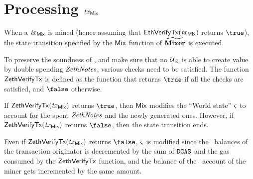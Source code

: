 
\section{Processing $\mathit{\mathit{tx}_{\mathsf{Mix}}}$}\label{zeth-protocol:process-tx}

When a $\mathit{\mathit{tx}_{\mathsf{Mix}}}$ is mined (hence assuming that $\mathsf{EthVerifyTx}(\mathit{\mathit{tx}_{\mathsf{Mix}}})$ returns $\true$), the state transition specified by the $\mathsf{Mix}$ function of $\widetilde{\mathbf{Mixer}}$ is executed.

To preserve the soundness of \zeth, and make sure that no $\mathcal{{U}_{Z}}$ is able to create value by double spending $\mathit{ZethNotes}$, various checks need to be satisfied. The function $\mathsf{ZethVerifyTx}$ is defined as the function that returns $\true$ if all the checks are satisfied, and $\false$ otherwise.

If $\mathsf{ZethVerifyTx}(\mathit{\mathit{tx}_{\mathsf{Mix}}})$ returns $\true$, then $\mathsf{Mix}$ modifies the ``World state'' $\mathit{\varsigma}$ to account for the spent $\mathit{ZethNotes}$ and the newly generated ones. However, if $\mathsf{ZethVerifyTx}(\mathit{\mathit{tx}_{\mathsf{Mix}}})$ returns $\false$, then the state transition ends.

\begin{notebox}
    Even if $\mathsf{ZethVerifyTx}(\mathit{\mathit{tx}_{\mathsf{Mix}}})$ returns $\false$, $\mathit{\varsigma}$ is modified since the \ethereum~balances of the transaction originator is decremented by the sum of $\mathtt{DGAS}$ and the gas consumed by the $\mathsf{ZethVerifyTx}$ function, and the balance of the \ethereum~account of the miner gets incremented by the same amount.
\end{notebox}

